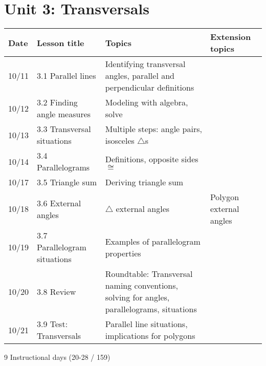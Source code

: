 \section*{Unit 3: Transversals}
\begin{tabular}{|p{0.9cm}|p{4cm}|p{7cm}|p{5cm}|}
  \hline
  Date & Lesson title & Topics  & Extension topics \\
  \hline
  10/11 & 3.1 Parallel lines & Identifying transversal angles, parallel and perpendicular definitions &  \\
  \hline
  10/12 & 3.2 Finding angle measures & Modeling with algebra, solve &  \\
  \hline
  10/13 & 3.3 Transversal situations & Multiple steps: angle pairs, isosceles $\triangle$s &  \\
  \hline
  10/14 & 3.4 Parallelograms & Definitions, opposite sides $\cong$ &  \\
  \hline
  10/17 & 3.5 Triangle sum & Deriving triangle sum &  \\
  \hline
  10/18 & 3.6 External angles & $\triangle$ external angles & Polygon external angles \\
  \hline
  10/19 & 3.7 Parallelogram situations & Examples of parallelogram properties &  \\
  \hline
  10/20 & 3.8 Review & Roundtable: Transversal naming conventions, solving for angles, parallelograms, situations & \\
  \hline
  10/21 & 3.9 Test: Transversals & Parallel line situations, implications for polygons &  \\
  \hline

\end{tabular} \par \vspace*{0.3cm}
9 Instructional days (20-28 / 159)


\newpage

